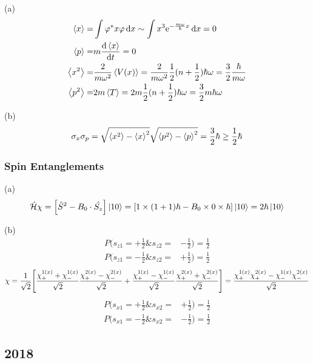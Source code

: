 (a)
\begin{align*}
    \expval{x} = & \int \varphi^* x \varphi \dd{x} \sim \int x^3 \mathrm{e}^{- \frac{m \omega}{\hbar} x} \dd{x} = 0\\
    \expval{p} = & m \dv{\expval{x}}{t} = 0\\
    \expval{x^2} = & \frac{2}{m \omega^2} \expval{V(x)} = \frac{2}{m \omega^2} \frac{1}{2} (n + \frac{1}{2}) \hbar \omega = \frac{3}{2} \frac{\hbar}{m \omega}\\
    \expval{p^2} = & 2 m \expval{T} = 2 m \frac{1}{2} (n + \frac{1}{2}) \hbar \omega = \frac{3}{2} m \hbar \omega
\end{align*}

(b)
\[
\sigma_x \sigma_p = \sqrt{\expval{x^2} - \expval{x}^2} \sqrt{\expval{p^2} - \expval{p}^2} = \frac{3}{2} \hbar \geq \frac{1}{2} \hbar
\]

\subsubsection{Spin Entanglements}

(a)
\[
\hat{\mathcal{H}} \chi = \qty[\hat{S}^2 - B_0 \cdot \hat{S_z}] \ket{1 0} = \qty[1 \times (1 + 1) \hbar - B_0 \times 0 \times \hbar] \ket{1 0} = 2 \hbar \ket{1 0}
\]

(b)
\begin{align*}
    P(s_{z1} = + \frac{1}{2} \& s_{z2} = & - \frac{1}{2}) = \frac{1}{2}\\
    P(s_{z1} = - \frac{1}{2} \& s_{z2} = & + \frac{1}{2}) = \frac{1}{2}
\end{align*} \begin{align*}
    \chi = \frac{1}{\sqrt{2}} \qty[\frac{\chi_+^{1(x)} + \chi_-^{1(x)}}{\sqrt{2}} \frac{\chi_+^{2(x)} - \chi_-^{2(x)}}{\sqrt{2}} + \frac{\chi_+^{1(x)} - \chi_-^{1(x)}}{\sqrt{2}} \frac{\chi_+^{2(x)} + \chi_-^{2(x)}}{\sqrt{2}}] = \frac{\chi_+^{1(x)} \chi_+^{2(x)} - \chi_-^{1(x)} \chi_-^{2(x)}}{\sqrt{2}}
\end{align*} \begin{align*}
    P(s_{x1} = + \frac{1}{2} \& s_{x2} = & + \frac{1}{2}) = \frac{1}{2}\\
    P(s_{x1} = - \frac{1}{2} \& s_{x2} = & - \frac{1}{2}) = \frac{1}{2}
\end{align*}

\subsection{2018}

